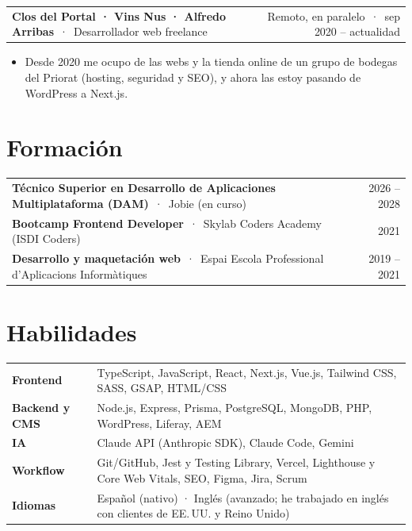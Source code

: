 \documentclass[10pt,a4paper]{article}
\makeatletter
\newcommand{\role}[4]{%
  \begin{tabularx}{\linewidth}{@{}X r@{}}
    \textbf{#1} \,·\, #2 & \small\color{muted}#4 \,·\, #3
  \end{tabularx}\par\vspace{0pt}}
\makeatother
\begin{document}
\role{Clos del Portal · Vins Nus · Alfredo Arribas}{Desarrollador web freelance}{sep 2020 -- actualidad}{Remoto, en paralelo}
\begin{itemize}
  \item Desde 2020 me ocupo de las webs y la tienda online de un grupo de bodegas del Priorat (hosting, seguridad y SEO), y ahora las estoy pasando de WordPress a Next.js.
\end{itemize}

\section{Formación}
\begin{tabularx}{\linewidth}{@{}X r@{}}
\textbf{Técnico Superior en Desarrollo de Aplicaciones Multiplataforma (DAM)} \,·\, Jobie {\small(en curso)} & \small\color{muted}2026 -- 2028 \\[2pt]
\textbf{Bootcamp Frontend Developer} \,·\, Skylab Coders Academy (ISDI Coders) & \small\color{muted}2021 \\[2pt]
\textbf{Desarrollo y maquetación web} \,·\, Espai Escola Professional d'Aplicacions Informàtiques & \small\color{muted}2019 -- 2021 \\
\end{tabularx}

\section{Habilidades}
\begin{tabularx}{\linewidth}{@{}l X@{}}
\textbf{Frontend} & TypeScript, JavaScript, React, Next.js, Vue.js, Tailwind CSS, SASS, GSAP, HTML/CSS \\
\textbf{Backend y CMS} & Node.js, Express, Prisma, PostgreSQL, MongoDB, PHP, WordPress, Liferay, AEM \\
\textbf{IA} & Claude API (Anthropic SDK), Claude Code, Gemini \\
\textbf{Workflow} & Git/GitHub, Jest y Testing Library, Vercel, Lighthouse y Core Web Vitals, SEO, Figma, Jira, Scrum \\
\textbf{Idiomas} & Español (nativo) · Inglés (avanzado; he trabajado en inglés con clientes de EE.\,UU. y Reino Unido) \\
\end{tabularx}
\end{document}
